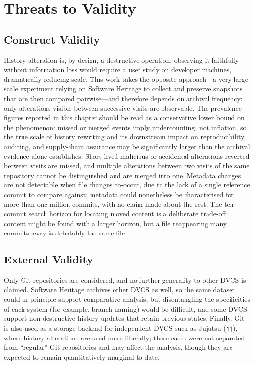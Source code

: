 \section{Threats to Validity}
\label{sec:hist-validity}

\subsection{Construct Validity}
\label{subsec:hist-val-bias}

History alteration is, by design, a destructive operation; observing it faithfully without information loss would require a user study on developer machines, dramatically reducing scale.
This work takes the opposite approach---a very large-scale experiment relying on Software Heritage to collect and preserve snapshots that are then compared pairwise---and therefore depends on archival frequency: only alterations visible between successive visits are observable.
The prevalence figures reported in this chapter should be read as a conservative lower bound on the phenomenon: missed or merged events imply undercounting, not inflation, so the true scale of history rewriting and its downstream impact on reproducibility, auditing, and supply-chain assurance may be significantly larger than the archival evidence alone establishes.
Short-lived malicious or accidental alterations reverted between visits are missed, and multiple alterations between two visits of the same repository cannot be distinguished and are merged into one.
Metadata changes are not detectable when file changes co-occur, due to the lack of a single reference commit to compare against; metadata could nonetheless be characterised for more than one million commits, with no claim made about the rest.
The ten-commit search horizon for locating moved content is a deliberate trade-off: content might be found with a larger horizon, but a file reappearing many commits away is debatably the same file.

\subsection{External Validity}
\label{subsec:hist-val-external}

Only Git repositories are considered, and no further generality to other DVCS is claimed.
Software Heritage archives other DVCS as well, so the same dataset could in principle support comparative analysis, but disentangling the specificities of each system (for example, branch naming) would be difficult, and some DVCS support non-destructive history updates that retain previous states.
Finally, Git is also used as a storage backend for independent DVCS such as Jujutsu (\texttt{jj}), where history alterations are used more liberally; these cases were not separated from ``regular'' Git repositories and may affect the analysis, though they are expected to remain quantitatively marginal to date.

